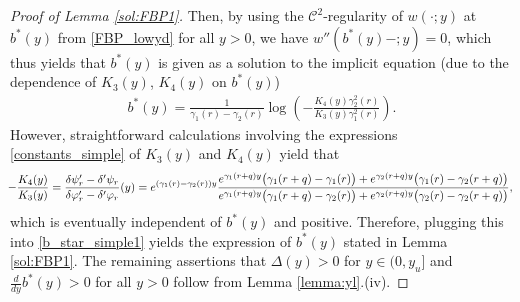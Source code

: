 \documentclass[11pt]{article} %
\renewcommand{\phi}{\varphi}
\numberwithin{komcounter}{section}
\numberwithin{equation}{section}
\numberwithin{theorem}{section}
\begin{document}
\begin{proof}[Proof of Lemma \ref{sol:FBP1}]
Then, by using the $\mathcal{C}^2$-regularity of $w(\cdot;y)$ at $b^*(y)$ from \eqref{FBP_lowyd} for all $y>0$, we have $w''(b^*(y)-; y) = 0$, which thus yields that $b^*(y)$ is given as a solution to the implicit equation (due to the dependence of $K_3(y)$, $K_4(y)$ on $b^*(y)$)
\begin{align}\label{b_star_simple1}
b^*(y) 
= \frac{1}{\gamma_1(r) - \gamma_2(r)} \log\left(-\frac{K_4 ( y) \gamma_2^2(r)}{K_3( y) \gamma_1^2(r)} \right).
\end{align}
However, straightforward calculations involving the expressions \eqref{constants_simple} of $K_3(y)$ and $K_4(y)$ yield that  
\begin{align}\label{eq:C4divC3}
\hspace{-1mm}
-\frac{K_4(y)}{K_3(y)}
= \frac{\delta\psi'_r - \delta'\psi_r}{\delta \phi'_r - \delta' \phi_r}(y) 
= e^{(\gamma_1(r) - \gamma_2(r))y} \frac{e^{\gamma_1(r+q)y}\bigl(\gamma_1(r+q) - \gamma_1(r)\bigr) + e^{\gamma_2(r+q)y}\bigl(\gamma_1(r) - \gamma_2(r+q)\bigr)}{e^{\gamma_1(r+q)y}\bigl(\gamma_1(r+q) - \gamma_2(r)\bigr) + e^{\gamma_2(r+q)y}\bigl(\gamma_2(r) - \gamma_2(r + q)\bigr)},
\end{align}
which is eventually independent of $b^*(y)$ and positive. 
Therefore, plugging this into \eqref{b_star_simple1} yields the expression of $b^*(y)$ stated in Lemma \ref{sol:FBP1}. 
The remaining assertions that 
$\Delta(y) > 0$ for $y\in (0,y_u]$ and $\frac{d}{dy} b^*(y) > 0$ for all $y > 0$ follow from Lemma \ref{lemma:yl}.(iv). 
\end{proof}
\end{document}
